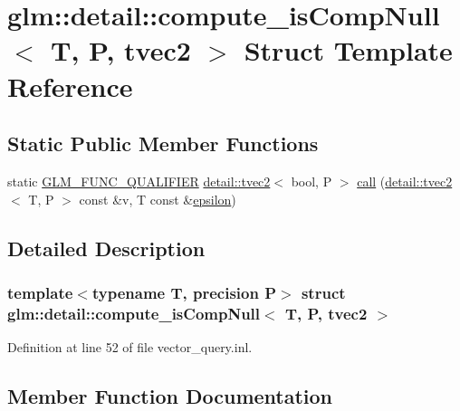 \hypertarget{structglm_1_1detail_1_1compute__is_comp_null_3_01_t_00_01_p_00_01tvec2_01_4}{}\section{glm\+:\+:detail\+:\+:compute\+\_\+is\+Comp\+Null$<$ T, P, tvec2 $>$ Struct Template Reference}
\label{structglm_1_1detail_1_1compute__is_comp_null_3_01_t_00_01_p_00_01tvec2_01_4}
\subsection*{Static Public Member Functions}
\begin{DoxyCompactItemize}
\item 
static \hyperlink{setup_8hpp_a33fdea6f91c5f834105f7415e2a64407}{G\+L\+M\+\_\+\+F\+U\+N\+C\+\_\+\+Q\+U\+A\+L\+I\+F\+I\+ER} \hyperlink{structglm_1_1detail_1_1tvec2}{detail\+::tvec2}$<$ bool, P $>$ \hyperlink{structglm_1_1detail_1_1compute__is_comp_null_3_01_t_00_01_p_00_01tvec2_01_4_abf9b6241b4469888505eb8d3a5f5afb5}{call} (\hyperlink{structglm_1_1detail_1_1tvec2}{detail\+::tvec2}$<$ T, P $>$ const \&v, T const \&\hyperlink{group__gtc__constants_gacb41049b8d22c8aa90e362b96c524feb}{epsilon})
\end{DoxyCompactItemize}


\subsection{Detailed Description}
\subsubsection*{template$<$typename T, precision P$>$\newline
struct glm\+::detail\+::compute\+\_\+is\+Comp\+Null$<$ T, P, tvec2 $>$}



Definition at line 52 of file vector\+\_\+query.\+inl.



\subsection{Member Function Documentation}
\mbox{\label{structglm_1_1detail_1_1compute__is_comp_null_3_01_t_00_01_p_00_01tvec2_01_4_abf9b6241b4469888505eb8d3a5f5afb5}} 
